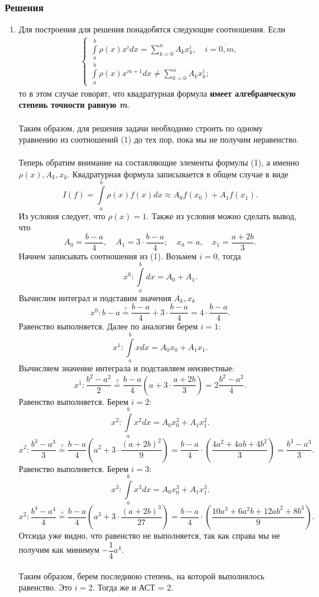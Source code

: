 \documentclass[a4paper, 12pt]{article}
\begin{document}
	\subsubsection*{Решения}
	\begin{enumerate}
		\item \hypertarget{t1}{}
		Для построения для решения понадобятся следующие соотношения. Если \begin{eqnarray}
			\begin{cases}
				\int\limits_a^b \rho(x) x^idx = \sum\limits_{k=0}^{n}A_kx^i_k,\quad i=\overline{0,m},\\
				\int\limits_a^b \rho(x) x^{m+1}dx \ne \sum\limits_{k=0}^{n}A_kx^i_k;
			\end{cases}
		\end{eqnarray}
		то в этом случае говорят, что квадратурная формула \textbf{имеет алгебраическую степень точности равную \textit{m}}.\\\\
		Таким образом, для решения задачи необходимо строить по одному уравнению из соотношений (1) до тех пор, пока мы не получим неравенство.\\\\
		Теперь обратим внимание на составляющие элементы формулы (1), а именно $\rho(x), A_k, x_k$. Квадратурная формула записывается в общем случае в виде $$I(f) = \int\limits_a^b\rho(x)f(x)dx \approx A_0f(x_0) + A_1 f(x_1).$$
		Из условия следует, что $\rho(x) = 1$. Также из условия можно сделать вывод, что $$A_0 = \dfrac{b-a}{4},\quad A_1 = 3\cdot \dfrac{b-a}{4};\quad x_0 = a,\quad x_1 = \dfrac{a+2b}{3}.$$
		Начнем записывать соотношения из (1). Возьмем $i=0$, тогда $$x^0 : \int\limits_a^b dx = A_0 + A_1.$$
		Вычислим интеграл и подставим значения $A_k, x_k$ $$x^0 : b-a \overset{?}{=} \dfrac{b-a}{4} + 3\cdot \dfrac{b-a}{4} =4\cdot \dfrac{ b-a}{4}.$$
		Равенство выполняется. Далее по аналогии берем $i=1$:
		$$x^1 : \int\limits_a^bx dx = A_0x_0 + A_1x_1.$$
		Вычисляем значение интеграла и подставляем неизвестные:
		$$x^1 : \dfrac{b^2-a^2}{2} \overset{?}{=} \dfrac{b-a}{4}\left(a + 3\cdot \dfrac{a+2b}{3}\right) = 2\dfrac{b^2-a^2}{4}.$$
		Равенство выполняется. Берем $i=2$:
		$$x^2 : \int\limits_a^bx^2 dx = A_0x_0^2 + A_1x_1^2.$$
		$$x^2 : \dfrac{b^3-a^3}{3} \overset{?}{=} \dfrac{b-a}{4}\left(a^2 + 3\cdot \dfrac{(a+2b)^2}{9}\right) = \dfrac{b-a}{4}\cdot\left( \dfrac{4a^2 + 4ab + 4b^2}{3}\right) = \dfrac{b^3-a^3}{3}.$$
		Равенство выполняется. Берем $i=3$:
		$$x^3 : \int\limits_a^bx^3 dx = A_0x_0^3 + A_1x_1^3.$$
		$$x^2 : \dfrac{b^4-a^4}{4} \overset{?}{=} \dfrac{b-a}{4}\left(a^3 + 3\cdot \dfrac{(a+2b)^3}{27}\right) = \dfrac{b-a}{4}\cdot\left( \dfrac{10a^3+6a^2b + 12ab^2 + 8b^3}{9}\right).$$
		Отсюда уже видно, что равенство не выполняется, так как справа мы не получим как минимум $-\dfrac14 a^4$.\\\\
		Таким образом, берем последнюю степень, на которой выполнялось равенство. Это $i=2$. Тогда же и АСТ = 2.
		

\end{enumerate}
\end{document}
